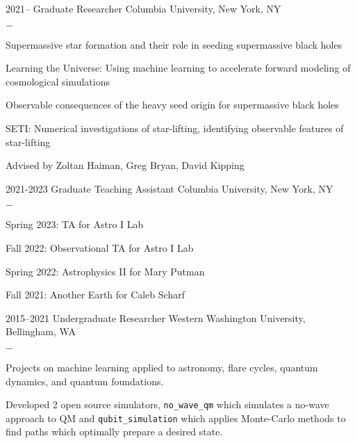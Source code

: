 \documentclass[]{scoggins-cv} %
\begin{document}
\begin{entrylist}
    \entry
    {2021--}
    {Graduate Researcher}
    {Columbia University, New York, NY}
    {%
        \vspace{-1em}
        \begin{list}{{\color{numcolor}$-$}}{\cvlist}
	  \item Supermassive star formation and their role in seeding supermassive black holes
          \item Learning the Universe: Using machine learning to accelerate forward modeling of cosmological simulations
          \item Observable consequences of the heavy seed origin for supermassive black holes
          \item SETI: Numerical investigations of star-lifting, identifying observable features of star-lifting

          \item Advised by Zoltan Haiman, Greg Bryan, David Kipping
        \end{list}
    }


  \entry
  {2021-2023}
  {Graduate Teaching Assistant}
  {Columbia University, New York, NY}
  {%
      \vspace{-1em}
      \begin{list}{{\color{numcolor}$-$}}{\cvlist}
        \item Spring 2023: TA for Astro I Lab
        \item Fall 2022: Observational TA for Astro I Lab
        \item Spring 2022: Astrophysics II for Mary Putman
        \item Fall 2021: Another Earth for Caleb Scharf
      \end{list}
  }

    \entry
    {2015--2021}
    {Undergraduate Researcher}
    {Western Washington University, Bellingham, WA}
    {%
        \vspace{-1em}
        \begin{list}{{\color{numcolor}$-$}}{\cvlist}
            \item Projects on machine learning applied to astronomy, flare cycles,
            quantum dynamics, and quantum foundations.
            \item Developed 2 open source simulators, \texttt{no\_wave\_qm} which simulates
            a no-wave approach to QM and \texttt{qubit\_simulation} which applies Monte-Carlo
            methods to find paths which optimally prepare a desired state.
        \end{list}
    }

\end{entrylist}
\end{document}
